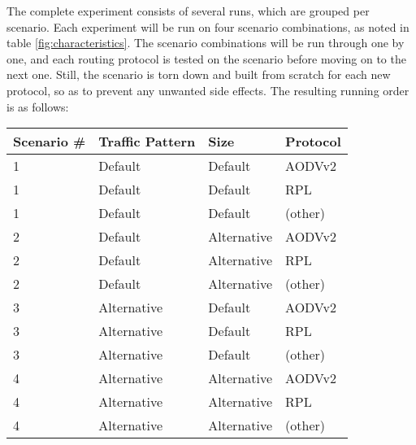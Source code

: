 \documentclass{acm_proc_article-sp}
\begin{document}
The complete experiment consists of several runs, which are grouped per scenario.
Each experiment will be run on four scenario combinations, as noted in table \ref{fig:characteristics}. The scenario combinations will be run through one by one, and each routing protocol is tested on the scenario before moving on to the next one. Still, the scenario is torn down and built from scratch for each new protocol, so as to prevent any unwanted side effects. The resulting running order is as follows:

\begin{tabularx}{\linewidth}{l | X | l | X }
  Scenario \# & Traffic Pattern & Size & Protocol \\
  \hline
  1 & Default & Default & AODVv2\\
  1 & Default & Default & RPL\\
  1 & Default & Default & (other)\\
  \hline
  2 & Default & Alternative & AODVv2\\
  2 & Default & Alternative & RPL\\
  2 & Default & Alternative & (other)\\
  \hline
  3 & Alternative & Default & AODVv2\\
  3 & Alternative & Default & RPL\\
  3 & Alternative & Default & (other)\\
  \hline
  4 & Alternative & Alternative & AODVv2\\
  4 & Alternative & Alternative & RPL\\
  4 & Alternative & Alternative & (other)\\
\end{tabularx}
\end{document}

